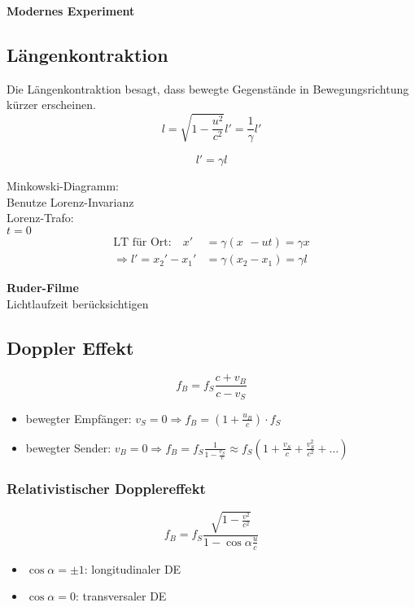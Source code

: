 \documentclass[titlepage,11pt,a4paper,ngerman]{report}
\newcommand{\tx}[1]{\textrm{#1}}
\newcommand{\frbox}[2]{\begin{tcolorbox}[colback=white,colframe=red!75!black,fonttitle=\bfseries,title=#1]#2\end{tcolorbox}}
\begin{document}
\textbf{Modernes Experiment}






\subsection{Längenkontraktion}
Die Längenkontraktion besagt, dass bewegte Gegenstände in Bewegungsrichtung kürzer erscheinen.
\begin{equation*}
l = \sqrt{1 - \frac{u^2}{c^2}} l' = \frac{1}{\gamma} l'
\end{equation*}
\frbox{Längenkontraktion}{\begin{equation*}
	l' = \gamma l
	\end{equation*}}
Minkowski-Diagramm:\\[5pt]
Benutze Lorenz-Invarianz\\
Lorenz-Trafo:\\
$ t = 0 $
\begin{align*}
\tx{LT für Ort:} \quad x' &= \gamma(x\phantom{_2} - ut) = \gamma x\\
\Rightarrow l' = x_2' - x_1' &= \gamma (x_2 - x_1) = \gamma l
\end{align*}






\textbf{Ruder-Filme}\\
Lichtlaufzeit berücksichtigen

\subsection{Doppler Effekt}
\begin{equation*}
f_B = f_S \frac{c + v_B}{c - v_S}
\end{equation*}
\begin{itemize}
	\item bewegter Empfänger: $ v_S = 0 \Rightarrow f_B = \left(1 + \frac{u_B}{c}\right) \cdot f_S $
	\item bewegter Sender: $ v_B = 0 \Rightarrow f_B = f_S \frac{1}{1 - \frac{v_S}{c}} \approx f_S \left(1 + \frac{v_S}{c} + \frac{v_S^2}{c^2} + \dots \right) $
\end{itemize}

\subsubsection{Relativistischer Dopplereffekt}
\begin{equation*}
f_B = f_S \frac{\sqrt{1 - \frac{v^2}{c^2}}}{1 - \cos \alpha \frac{u}{c}}
\end{equation*}
\begin{itemize}
	\item $ \cos \alpha = \pm 1 $: longitudinaler DE
	\item $ \cos \alpha = 0 $: transversaler DE
\end{itemize}
\end{document}
